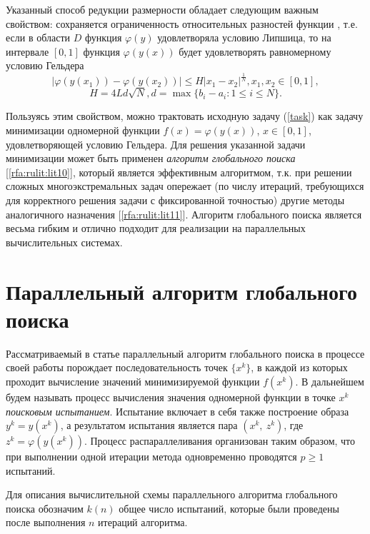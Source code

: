 \documentclass[10pt,a4paper]{book}
\begin{document}
Указанный способ редукции размерности обладает следующим важным свойством: сохраняется ограниченность относительных разностей функции , т.е. если в области $D$ функция $\varphi(y)$ удовлетворяла условию Липшица, то на интервале $[0,1]$ функция $\varphi(y(x))$ будет удовлетворять равномерному условию Гельдера
\begin{equation}
\label{holder}
\left|\varphi(y(x_1))-\varphi(y(x_2))\right|\leqslant H{\left|x_1-x_2\right|}^{\frac{1}{N}}, 
 x_1,x_2\in[0,1],
\end{equation}
\begin{equation}
H=4Ld\sqrt{N},d=\max\{b_i-a_i:1\leqslant i\leqslant N\}.
\end{equation}
 
Пользуясь этим свойством, можно трактовать исходную задачу (\ref{task}) как задачу минимизации одномерной функции $f\left(x\right)=\varphi\left(y\left(x\right)\right)$, $x\in[0,1]$, удовлетворяющей условию Гельдера. 
Для решения указанной задачи минимизации может быть применен \textit{алгоритм глобального поиска} [\ref{rfa:rulit:lit10}], который является эффективным алгоритмом, т.к. при решении сложных многоэкстремальных задач опережает (по числу итераций, требующихся для корректного решения задачи с фиксированной точностью) другие методы аналогичного назначения [\ref{rfa:rulit:lit11}].
Алгоритм глобального поиска является весьма гибким и отлично подходит для реализации на параллельных вычислительных системах.

\section{Параллельный алгоритм глобального поиска}

Рассматриваемый в статье параллельный алгоритм глобального поиска в процессе своей работы порождает последовательность точек $\{x^k\}$, в каждой из которых проходит вычисление значений минимизируемой функции $f(x^k)$. В дальнейшем будем называть процесс вычисления значения одномерной функции в точке $x^k$ \textit{поисковым испытанием}. Испытание включает в себя также построение образа $y^k=y(x^k)$, а результатом испытания является пара $(x^k,\ z^k)$, где $z^k=\varphi(y(x^k))$. Процесс распараллеливания организован таким образом, что при выполнении одной итерации метода одновременно проводятся $p\geq1$ испытаний. 

Для описания вычислительной схемы параллельного алгоритма глобального поиска обозначим $k(n)$ общее число испытаний, которые были проведены после выполнения $n$ итераций алгоритма. 
\end{document}
